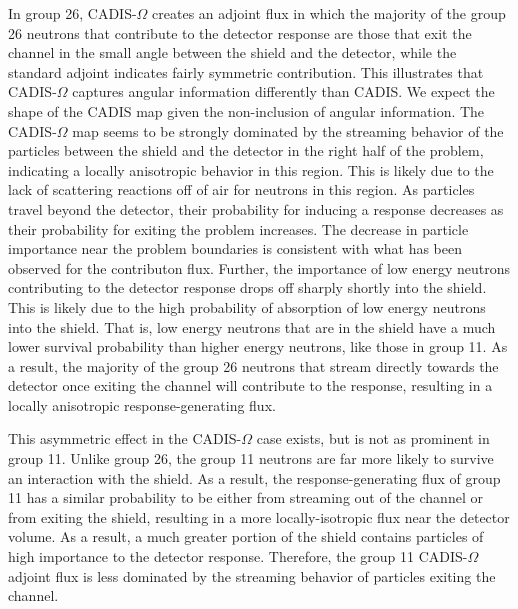 \documentclass[12pt]{article}
\begin{document}
In group 26, CADIS-$\Omega$ creates an adjoint flux in which the majority of the group 26 neutrons that contribute to the detector response are those that exit the channel in the small angle between the shield and the detector, while the standard adjoint indicates fairly symmetric contribution. 
This illustrates that CADIS-$\Omega$ captures angular information differently than CADIS. 
We expect the shape of the CADIS map given the non-inclusion of angular information. 
The CADIS-$\Omega$ map seems to be strongly dominated by the streaming behavior of the particles between the shield and the detector in the right half of the problem, indicating a locally anisotropic behavior in this region. This is likely due to the lack of scattering reactions off of air for neutrons in this region. As particles travel beyond the detector, their probability for inducing a response decreases as their probability for exiting the problem increases. The decrease in particle importance near the problem boundaries is consistent with what has been observed for the contributon flux. Further, the importance of low energy neutrons contributing to the detector response drops off sharply shortly into the shield. This is likely due to the high probability of absorption of low energy neutrons into the shield. That is, low energy neutrons that are in the shield have a much lower survival probability than higher energy neutrons, like those in group 11. 
As a result, the majority of the group 26 neutrons that stream directly towards the detector once exiting the channel will contribute to the response, resulting in a locally anisotropic response-generating flux. 

This asymmetric effect in the CADIS-$\Omega$ case exists, but is not as prominent in group 11. 
Unlike group 26, the group 11 neutrons are far more likely to survive an interaction with the shield. As a result, the response-generating flux of group 11 has a similar probability to be either from streaming out of the channel or from exiting the shield, resulting in a more locally-isotropic flux near the detector volume. As a result, a much greater portion of the shield contains particles of high importance to the detector response. Therefore, the group 11 CADIS-$\Omega$ adjoint flux is less dominated by the streaming behavior of particles exiting the channel. 
\end{document}
